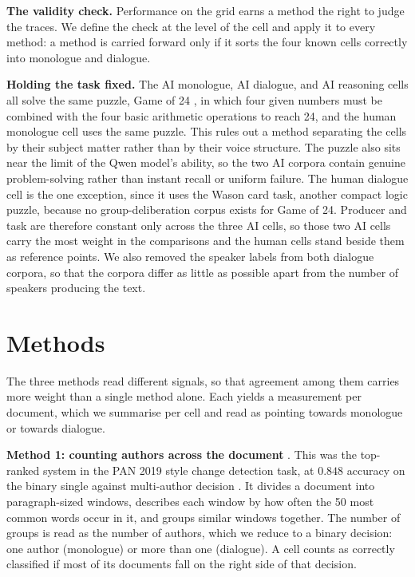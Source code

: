 \documentclass[10pt,twocolumn]{article}
\begin{document}
\textbf{The validity check.} Performance on the grid earns a method the right to judge the traces.
We define the check at the level of the cell and apply it to every method: a method is carried
forward only if it sorts the four known cells correctly into monologue and dialogue.

\textbf{Holding the task fixed.} The AI monologue, AI dialogue, and AI reasoning cells all solve the
same puzzle, Game of 24 \cite{yao2023}, in which four given numbers must be combined with the four
basic arithmetic operations to reach 24, and the human monologue cell uses the same puzzle. This
rules out a method separating the cells by their subject matter rather than by their voice structure.
The puzzle also sits near the limit of the Qwen model's ability, so the two AI corpora contain
genuine problem-solving rather than instant recall or uniform failure. The human dialogue cell is the
one exception, since it uses the Wason card task, another compact logic puzzle, because no
group-deliberation corpus exists for Game of 24. Producer and task are therefore constant only across
the three AI cells, so those two AI cells carry the most weight in the comparisons and the human
cells stand beside them as reference points. We also removed the speaker labels from both dialogue corpora, so that the
corpora differ as little as possible apart from the number of speakers producing the text.

\section{Methods}
The three methods read different signals, so that agreement among them carries more weight than a
single method alone. Each yields a measurement per document, which we summarise per cell and read as
pointing towards monologue or towards dialogue.

\textbf{Method 1: counting authors across the document} \cite{nath2019}. This was the top-ranked
system in the PAN 2019 style change detection task, at $0.848$ accuracy on the binary single against
multi-author decision \cite{zangerle2019}. It divides a document into paragraph-sized windows,
describes each window by how often the 50 most common words occur in it, and groups similar windows
together. The number of groups is read as the number of authors, which we reduce to a binary
decision: one author (monologue) or more than one (dialogue). A cell counts as correctly classified
if most of its documents fall on the right side of that decision.
\end{document}
